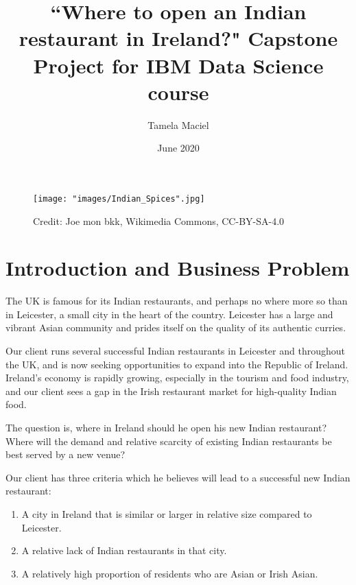 \documentclass[a4paper,11pt]{article}
\begin{document}
%
   \title{``Where to open an Indian restaurant in Ireland?" Capstone Project for IBM Data Science course}

   \author{Tamela Maciel}
          
   \date{June 2020}

   \maketitle
   
 

\begin{figure}[htb]
   \centering
   \texttt{[image: "images/Indian\_Spices".jpg]}
      \caption{Credit: Joe mon bkk, Wikimedia Commons, CC-BY-SA-4.0}
      \label{fig:spices}
\end{figure}
\section{Introduction and Business Problem}
The UK is famous for its Indian restaurants, and perhaps no where more so than in Leicester, a small city in the heart of the country. Leicester has a large and vibrant Asian community and prides itself on the quality of its authentic curries. 

Our client runs several successful Indian restaurants in Leicester and throughout the UK, and is now seeking opportunities to expand into the Republic of Ireland. Ireland's economy is rapidly growing, especially in the tourism and food industry, and our client sees a gap in the Irish restaurant market for high-quality Indian food. 

The question is, where in Ireland should he open his new Indian restaurant? Where will the demand and relative scarcity of existing Indian restaurants be best served by a new venue?

Our client has three criteria which he believes will lead to a successful new Indian restaurant:
\begin{enumerate}
	\item A city in Ireland that is similar or larger in relative size compared to Leicester.
	\item A relative lack of Indian restaurants in that city.
	\item A relatively high proportion of residents who are Asian or Irish Asian.
\end{enumerate}
\end{document}
